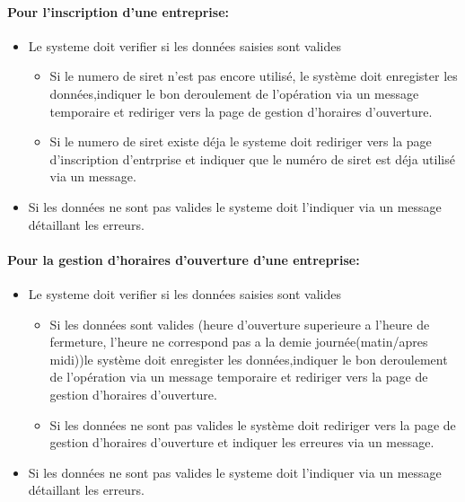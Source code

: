 \documentclass{article}
\begin{document}
\paragraph{Pour l'inscription d'une entreprise: }
\begin{itemize}
\item Le systeme doit verifier si les données saisies sont valides

		\begin{itemize}
		\item Si le numero de siret n'est pas encore utilisé, le système
			doit enregister les données,indiquer le bon deroulement de l'opération via un message temporaire et rediriger vers la page de gestion d'horaires d'ouverture.
		\item Si le numero de siret existe déja le systeme doit rediriger vers
			la page d'inscription d'entrprise et indiquer que le numéro de siret est déja utilisé
			via un message.
		\end{itemize}

\item Si les données ne sont pas valides le systeme doit l'indiquer
	via un message détaillant les erreurs.
\end{itemize}

\paragraph{Pour la gestion d'horaires d'ouverture d'une entreprise: }
\begin{itemize}
\item Le systeme doit verifier si les données saisies sont valides

		\begin{itemize}
		\item Si les données sont valides (heure d'ouverture superieure a l'heure de fermeture, l'heure ne correspond pas a la demie journée(matin/apres midi))le système
			doit enregister les données,indiquer le bon deroulement de l'opération via un message temporaire et rediriger vers la page de gestion d'horaires d'ouverture.
		\item Si les données ne sont pas valides le système doit rediriger vers
			la page de gestion d'horaires d'ouverture et indiquer les erreures
			via un message.
		\end{itemize}

\item Si les données ne sont pas valides le systeme doit l'indiquer
	via un message détaillant les erreurs.
\end{itemize}
\end{document}
